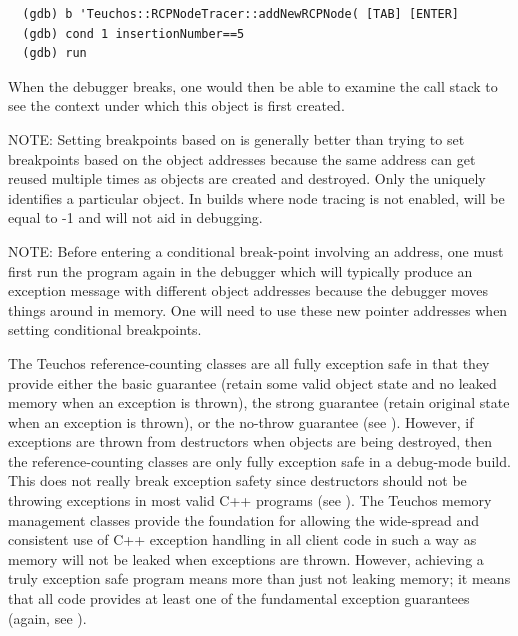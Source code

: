 \documentclass[pdf,ps2pdf,11pt]{SANDreport}
\begin{document}
{\small
\begin{verbatim}
  (gdb) b 'Teuchos::RCPNodeTracer::addNewRCPNode( [TAB] [ENTER]
  (gdb) cond 1 insertionNumber==5
  (gdb) run
\end{verbatim}}

When the debugger breaks, one would then be able to examine the call
stack to see the context under which this {} object is
first created.

NOTE: Setting breakpoints based on {} is
generally better than trying to set breakpoints based on the object
addresses because the same address can get reused multiple times as
objects are created and destroyed.  Only the {}
uniquely identifies a particular {} object.  In builds
where node tracing is not enabled, {} will be
equal to -1 and will not aid in debugging.

NOTE: Before entering a conditional break-point involving an address,
one must first run the program again in the debugger which will
typically produce an exception message with different object addresses
because the debugger moves things around in memory.  One will need to
use these new pointer addresses when setting conditional breakpoints.

The Teuchos reference-counting classes are all fully exception safe in
that they provide either the basic guarantee (retain some valid object
state and no leaked memory when an exception is thrown), the strong
guarantee (retain original state when an exception is thrown), or the
no-throw guarantee (see {}\cite[Item 71]{C++CodingStandards05}).
However, if exceptions are thrown from destructors when objects are
being destroyed, then the reference-counting classes are only fully
exception safe in a debug-mode build.  This does not really break
exception safety since destructors should not be throwing exceptions
in most valid C++ programs (see {}\cite[Item
51]{C++CodingStandards05}).  The Teuchos memory management classes
provide the foundation for allowing the wide-spread and consistent use
of C++ exception handling in all client code in such a way as memory
will not be leaked when exceptions are thrown.  However, achieving a
truly exception safe program means more than just not leaking memory;
it means that all code provides at least one of the fundamental
exception guarantees (again, see {}\cite[Item
71]{C++CodingStandards05}).
\end{document}
